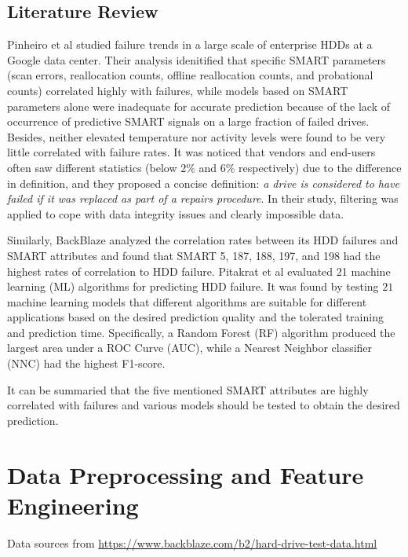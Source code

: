 \documentclass[12pt,a4paper,english]{amsart}
\begin{document}
\subsection{Literature Review}

Pinheiro et al\cite{Pinheiro2007} studied failure trends in a large scale of enterprise HDDs at a Google data center. 
Their analysis idenitified that specific SMART parameters (scan errors, reallocation counts, offline reallocation counts, and probational counts) correlated highly with failures, while models based on SMART parameters alone were inadequate for accurate prediction because of the lack of occurrence of predictive SMART signals on a large fraction of failed drives.
Besides, neither elevated temperature nor activity levels were found to be very little correlated with failure rates.
It was noticed that vendors and end-users often saw different statistics (below $2\%$ and $6\%$ respectively) due to the difference in definition, and they proposed a concise definition: \textit{a drive is considered to have failed if it was replaced as part of a repairs procedure}.
In their study, filtering was applied to cope with data integrity issues and clearly impossible data.

Similarly, BackBlaze analyzed the correlation rates between its HDD failures and SMART attributes and found that SMART 5, 187, 188, 197, and 198 had the highest rates of correlation to HDD failure.
Pitakrat et al\cite{Pitakrat2013} evaluated 21 machine learning (ML) algorithms for predicting HDD failure. 
It was found by testing $21$ machine learning models that different algorithms are suitable for different applications based on the desired prediction quality and the tolerated training and prediction time.
Specifically, a Random Forest (RF) algorithm produced the largest area under a ROC Curve (AUC), while a Nearest Neighbor classifier (NNC) had the highest F1-score.

It can be summaried that the five mentioned SMART attributes are highly correlated with failures and various models should be tested to obtain the desired prediction. 
%
\section{Data Preprocessing and Feature Engineering}

Data sources from \url{https://www.backblaze.com/b2/hard-drive-test-data.html}
\end{document}
